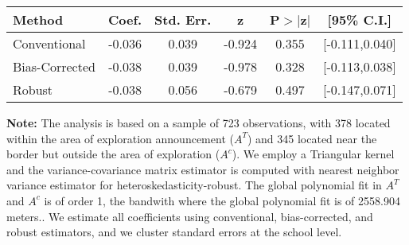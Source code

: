 \begin{table}[htbp]\centering
 \footnotesize 
\begin{tabular}{lccccc}
\hline\hline
Method & Coef. & Std. Err. & z & P$>|$z$|$ & [95\% C.I.] \\ 
\hline \hline  
Conventional & -0.036 & 0.039 & -0.924 & 0.355 & [-0.111,0.040] \\ 
 Bias-Corrected & -0.038 & 0.039 & -0.978 & 0.328 & [-0.113,0.038] \\ 
Robust & -0.038 & 0.056 & -0.679 & 0.497 & [-0.147,0.071] \\ 
  \hline\hline
\end{tabular}
\label{table:rd}
\begin{tablenotes} 
  \justifying \tiny \textbf{Note: }    
   The analysis is based on a sample of 723 observations, with 378 located within the area of exploration announcement ($A^{T}$) and 345 located near the border but outside the area of exploration  ($A^{c}$). 
           We employ a Triangular kernel and the variance-covariance matrix estimator is computed with nearest neighbor variance estimator for heteroskedasticity-robust. The global polynomial fit in  $A^{T}$ and $A^{c}$ is of order 1, the bandwith where the global polynomial fit is of 2558.904 meters.. We estimate all coefficients using conventional, bias-corrected, and robust estimators, and we cluster standard errors at the school level. \end{tablenotes} 
 \end{table} 
